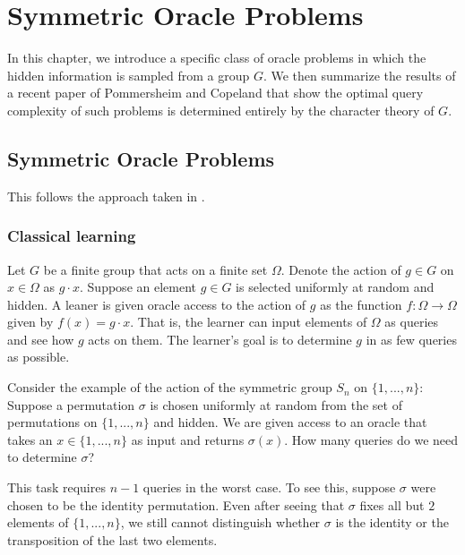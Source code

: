 
\chapter{Symmetric Oracle Problems}



In this chapter, we introduce a specific class of oracle problems in which the hidden information is sampled from a 
group $G$. We then summarize the results of a recent paper \cite{jamie} of Pommersheim and Copeland that show the 
optimal query complexity of such problems is determined entirely by the character theory of $G$. 





\section{Symmetric Oracle Problems}
This follows the approach taken in \cite{jamie}.


\subsection{Classical learning}

Let $G$ be a finite group that acts on a finite set $\Omega$. Denote the action of $g \in G$ on $x \in \Omega$ as 
$g \cdot x$. Suppose an element $g \in G$ is selected uniformly at random and hidden. A leaner is given oracle 
access to the action of $g$ as the function $f : \Omega \rightarrow \Omega$ given by $f(x) = g \cdot x$. That is, 
the learner can input elements of $\Omega$ as queries and see how $g$ acts on them. The learner's goal is to 
determine $g$ in as few queries as possible.

\begin{example}
    Consider the example of the action of the symmetric group $S_n$ on $\{1, ..., n\}$:
    Suppose a permutation $\sigma$ is chosen uniformly at random from the set of permutations on $\{1, ..., n\}$ 
    and hidden. We are given access to an oracle that takes an $x \in \{1,...,n\}$ as input and returns 
    $\sigma(x)$. How many queries do we need to determine $\sigma$?
\end{example}

This task requires $n-1$ queries in the worst case. To see this, suppose $\sigma$ were chosen to be the identity 
permutation.  Even after seeing that $\sigma$ fixes all but $2$ elements of $\{1,...,n\}$, we still cannot 
distinguish whether $\sigma$ is the identity or the transposition of the last two elements.



